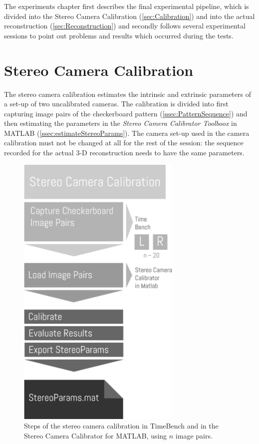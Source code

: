\label{c:Experiments}
The experiments chapter first describes the final experimental pipeline, which is divided into the Stereo Camera Calibration (\autoref{sec:Calibration}) and into the actual reconstruction (\autoref{sec:Reconstruction}) and secondly follows several experimental sessions to point out problems and results which occurred during the tests.

\section{Stereo Camera Calibration}\label{sec:Calibration}
The stereo camera calibration estimates the intrinsic and extrinsic parameters of a set-up of two uncalibrated cameras. The calibration is divided into first capturing image pairs of the checkerboard pattern (\autoref{ssec:PatternSequence}) and then estimating the parameters in the \textit{Stereo Camera Calibrator Toolboox} in MATLAB (\autoref{ssec:estimateStereoParams}). The camera set-up used in the camera calibration must not be changed at all for the rest of the session: the sequence recorded for the actual 3-D reconstruction needs to have the same parameters.

\begin{figure}[htbp]
		\centering
		\includegraphics[width=0.7\textwidth]{figures/CameraCalibration}
		\caption[Steps of the stereo camera calibration]{Steps of the stereo camera calibration in TimeBench and in the Stereo Camera Calibrator for MATLAB, using $n$ image pairs.}
		\label{fig:stereoCamCalib}
\end{figure} 

